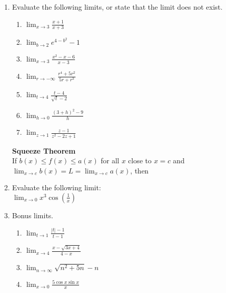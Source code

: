 \documentclass[12pt]{article}
\begin{document}
\begin{enumerate}
\item Evaluate the following limits, or state that the limit does not exist.
\begin{enumerate}
\item $ \displaystyle \lim_{x\to 3} \frac{x+1}{x+3}$
\vfill
\item $ \displaystyle \lim_{b \to 2} e^{4-b^2}-1$
\vfill
\item $ \displaystyle \lim_{x\to 3} \frac{x^2-x-6}{x-3}$
\vfill
\item $\displaystyle \lim_{r\to-\infty}\frac{r^4+5r^2}{5r+r^3}$
\vfill
\newpage
~
\item $ \displaystyle \lim_{t \to 4} \frac{t-4}{\sqrt{t}-2}$
\vfill
\item $ \displaystyle \lim_{h \to 0} \frac{(3+h)^2-9}{h}$
\vfill
\item $ \displaystyle \lim_{z \to 1} \frac{z-1}{z^2-2z+1}$
\vfill
\end{enumerate}

\begin{tcolorbox}
\textbf{Squeeze Theorem} \\
If $b(x)\leq f(x) \leq a(x)$ for all $x$ close to $x=c$  
and $\displaystyle \lim_{x\to c} b(x)=L=\lim_{x\to c} a(x)$, then \\
\vspace{15mm}
\end{tcolorbox}

\item Evaluate the following limit:\\
$ \displaystyle \lim_{x\to 0} x^3\cos\left(\frac{1}{x}\right)$
\vfill



\item Bonus limits.
\begin{multicols}{2}
\begin{enumerate}


\item $\displaystyle \lim_{t\to1}\frac{|t|-1}{t-1}$

\vfill
\item $\displaystyle \lim_{x\to4}\frac{x-\sqrt{3x+4}}{4-x}$
\vfill
\item $\displaystyle \lim_{n\to\infty}\sqrt{n^2+5n}-n$
\item $\displaystyle \lim_{x\to 0}\frac{5\cos x \sin x}{x}$


\end{enumerate}
\end{multicols}
\end{enumerate}
\end{document}
